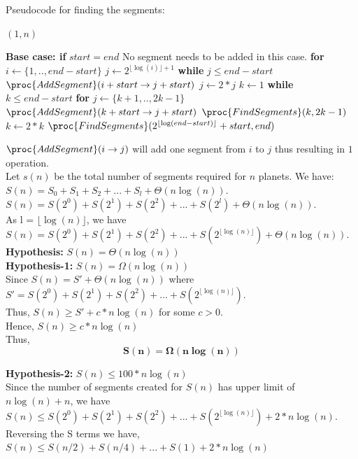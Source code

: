 \documentclass[11pt]{article}
\begin{document}
\noindent Pseudocode for finding the segments:
\begin{codebox}
    \li {}$(1,n)$
\end{codebox}

\begin{codebox}
    \li \textbf{Base case: if} $start=end$
    \li \quad No segment needs to be added in this case.
    \li \textbf{for} $i \leftarrow \{1,.., end-start\}$ 
    \li \quad $j \leftarrow 2^{\lfloor \log(i) \rfloor + 1}$
    \li \quad \textbf{while} $j \leq end-start$ 
    \li \quad \quad $\proc{AddSegment}(i+start \rightarrow j+start)$
    \li \quad \quad $j \leftarrow 2*j$
    \li $k \leftarrow 1$
    \li \textbf{while} $k \leq end-start$
    \li \quad \textbf{for} $j \leftarrow \{k+1,.., 2k-1\}$
    \li \quad \quad $\proc{AddSegment}(k+start \rightarrow j+start)$
    \li \quad $\proc{FindSegments}(k, 2k-1)$
    \li \quad $k \leftarrow 2*k$
    \li $\proc{FindSegments}(2^{\lfloor \log(end-start) \rfloor} + start, end)$
\end{codebox}
$\proc{AddSegment}(i \rightarrow j)$ will add one segment from $i$ to $j$ thus resulting in $1$ operation.\\

\noindent Let $s(n)$ be the total number of segments required for $n$ planets. We have:\\
$S(n) = S_0+S_1+S_2+...+S_l+\Theta(n\log(n))$.\\
$S(n) = S(2^0)+S(2^1)+S(2^2)+...+S(2^l)+\Theta(n\log(n))$.\\
As l = $\lfloor \log(n)\rfloor$, we have\\
$S(n) = S(2^0)+S(2^1)+S(2^2)+...+S(2^{\lfloor \log(n)\rfloor})+\Theta(n\log(n))$.\\

\textbf{Hypothesis:} $S(n) = \Theta(n\log(n))$\\
\textbf{Hypothesis-1:} $S(n) = \Omega(n\log(n))$\\
Since $S(n) = S'+\Theta(n\log(n))$ where $S' = S(2^0)+S(2^1)+S(2^2)+...+S(2^{\lfloor \log(n)\rfloor})$.\\
Thus, $S(n) \geq S'+c*n\log(n)$ for some $c>0$.\\
Hence, $S(n) \geq c*n\log(n)$\\
Thus, $$\mathbf{S(n) = \Omega(n\log(n))}$$

\noindent \textbf{Hypothesis-2:} $S(n) \leq 100*n\log(n)$\\
Since the number of segments created for $S(n)$ has upper limit of $n\log(n)+n$, we have
$S(n) \leq S(2^0)+S(2^1)+S(2^2)+...+S(2^{\lfloor \log(n)\rfloor})+2*n\log(n)$.\\
Reversing the S terms we have,\\
$S(n) \leq S(n/2)+S(n/4)+...+S(1)+2*n\log(n)$\\
\end{document}
